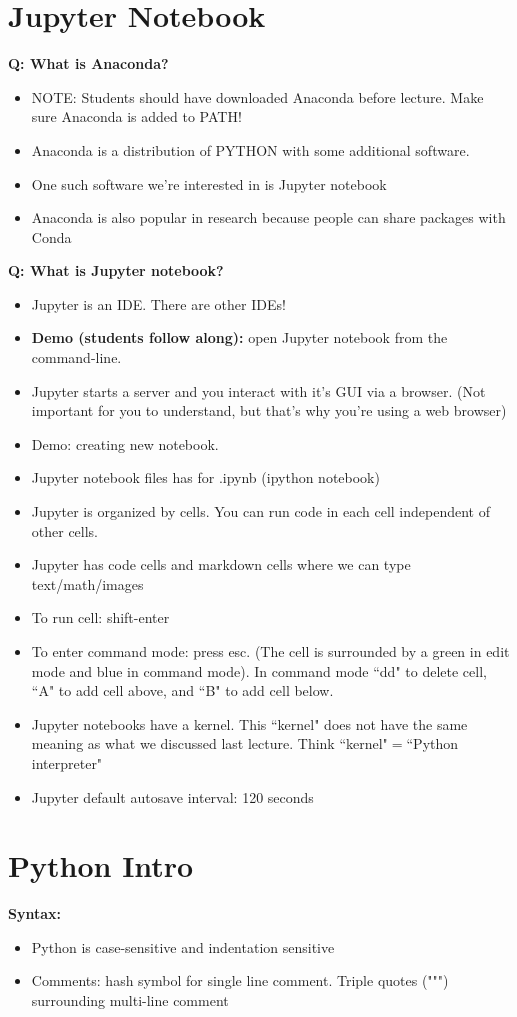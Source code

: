 \documentclass[12pt]{article}
\numberwithin{equation}{section}
\begin{document}
\section{Jupyter Notebook}
\textbf{Q: What is Anaconda?}
\begin{itemize}
    \item NOTE: Students should have downloaded Anaconda before lecture. Make sure Anaconda is added to PATH!
    \item Anaconda is a distribution of PYTHON with some additional software. 
    \item One such software we're interested in is Jupyter notebook
    \item Anaconda is also popular in research because people can share packages with Conda
\end{itemize}

\textbf{Q: What is Jupyter notebook?}
\begin{itemize}
    \item Jupyter is an IDE. There are other IDEs!
    \item \textbf{Demo (students follow along):} open Jupyter notebook from the command-line.
    \item Jupyter starts a server and you interact with it's GUI via a browser. (Not important for you to understand, but that's why you're using a web browser)
    \item Demo: creating new notebook.
    \item Jupyter notebook files has for .ipynb (ipython notebook)
    \item Jupyter is organized by cells. You can run code in each cell independent of other cells.
    \item Jupyter has code cells and markdown cells where we can type text/math/images
    \item To run cell: shift-enter
    \item To enter command mode: press esc. (The  cell is surrounded by a green in edit mode and blue in command mode). In command mode ``dd" to delete cell, ``A" to add cell above, and ``B" to add cell below.
    \item Jupyter notebooks have a kernel. This ``kernel" does not have the same meaning as what we discussed last lecture. Think ``kernel"$=$``Python interpreter"
    \item Jupyter default autosave interval: 120 seconds
\end{itemize}

\section{Python Intro}
\textbf{Syntax:}
\begin{itemize}
    \item Python is case-sensitive and indentation sensitive
    \item Comments: hash symbol for single line comment. Triple quotes (""") surrounding multi-line comment
\end{itemize}
\end{document}
